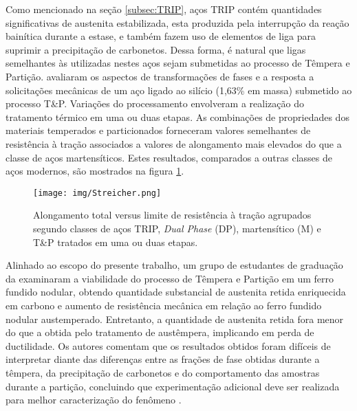 Como mencionado na seção \ref{subsec:TRIP}, aços TRIP contém quantidades significativas de austenita estabilizada, esta produzida pela interrupção da reação bainítica durante a estase, e também fazem uso de elementos de liga para suprimir a precipitação de carbonetos. Dessa forma, é natural que ligas semelhantes às utilizadas nestes aços sejam submetidas ao processo de Têmpera e Partição.  %
avaliaram os aspectos de transformações de fases e a resposta a solicitações mecânicas de um aço ligado ao silício (1,63\% em massa) submetido ao processo T\&P. Variações do processamento envolveram a realização do tratamento térmico em uma ou duas etapas. As combinações de propriedades dos materiais temperados e particionados forneceram valores semelhantes de resistência à tração associados a valores de alongamento mais elevados do que a classe de aços martensíticos. Estes resultados, comparados a outras classes de aços modernos, são mostrados na figura \ref{fig:TRIPQP}.

\begin{figure}
	\texttt{[image: img/Streicher.png]}
	\caption{Alongamento total versus limite de resistência à tração agrupados segundo classes de aços TRIP, \textit{Dual Phase} (DP), martensítico (M) e T\&P tratados em uma ou duas etapas\cite{Streicher2004}.}
	\label{fig:TRIPQP}
\end{figure}

Alinhado ao escopo do presente trabalho, um grupo de estudantes de graduação da  examinaram a viabilidade do processo de Têmpera e Partição em um ferro fundido nodular, obtendo quantidade substancial de austenita retida enriquecida em carbono e aumento de resistência mecânica em relação ao ferro fundido nodular austemperado. Entretanto, a quantidade de austenita retida fora menor do que a obtida pelo tratamento de austêmpera, implicando em perda de ductilidade. Os autores comentam que os resultados obtidos foram difíceis de interpretar diante das diferenças entre as frações de fase obtidas durante a têmpera, da precipitação de carbonetos e do comportamento das amostras durante a partição, concluindo que experimentação adicional deve ser realizada para melhor caracterização do fenômeno \cite{Speer2004}.

